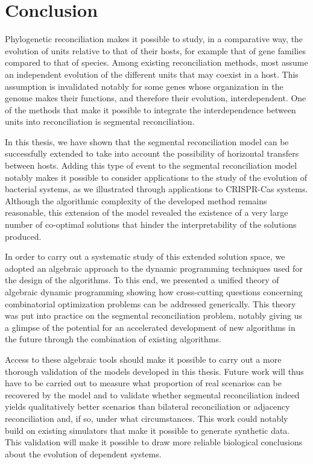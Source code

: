 \chapter*{Conclusion}

Phylogenetic reconciliation makes it possible to study, in a comparative way, the evolution of units relative to that of their hosts, for example that of gene families compared to that of species.
Among existing reconciliation methods, most assume an independent evolution of the different units that may coexist in a host.
This assumption is invalidated notably for some genes whose organization in the genome makes their functions, and therefore their evolution, interdependent.
One of the methods that make it possible to integrate the interdependence between units into reconciliation is segmental reconciliation.

In this thesis, we have shown that the segmental reconciliation model can be successfully extended to take into account the possibility of horizontal transfers between hosts.
Adding this type of event to the segmental reconciliation model notably makes it possible to consider applications to the study of the evolution of bacterial systems, as we illustrated through applications to CRISPR-Cas systems.
Although the algorithmic complexity of the developed method remains reasonable, this extension of the model revealed the existence of a very large number of co-optimal solutions that hinder the interpretability of the solutions produced.

In order to carry out a systematic study of this extended solution space, we adopted an algebraic approach to the dynamic programming techniques used for the design of the algorithms.
To this end, we presented a unified theory of algebraic dynamic programming showing how cross-cutting questions concerning combinatorial optimization problems can be addressed generically.
This theory was put into practice on the segmental reconciliation problem, notably giving us a glimpse of the potential for an accelerated development of new algorithms in the future through the combination of existing algorithms.

Access to these algebraic tools should make it possible to carry out a more thorough validation of the models developed in this thesis.
Future work will thus have to be carried out to measure what proportion of real scenarios can be recovered by the model and to validate whether segmental reconciliation indeed yields qualitatively better scenarios than bilateral reconciliation or adjacency reconciliation and, if so, under what circumstances.
This work could notably build on existing simulators that make it possible to generate synthetic data.
This validation will make it possible to draw more reliable biological conclusions about the evolution of dependent systems.

